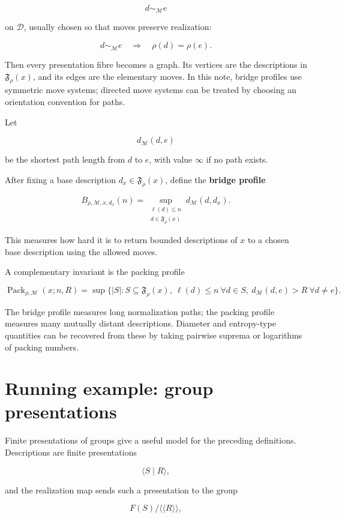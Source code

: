 \documentclass[11pt]{article}
\begin{document}
\[
d\sim_{\mathcal M} e
\]

on \(\mathcal D\), usually chosen so that moves preserve realization:

\[
d\sim_{\mathcal M} e
\quad\Longrightarrow\quad
\rho(d)=\rho(e).
\]

Then every presentation fibre becomes a graph. Its vertices are the descriptions in \(\mathfrak F_\rho(x)\), and its edges are the elementary moves. In this note, bridge profiles use symmetric move systems; directed move systems can be treated by choosing an orientation convention for paths.

Let

\[
d_{\mathcal M}(d,e)
\]

be the shortest path length from \(d\) to \(e\), with value \(\infty\) if no path exists.

After fixing a base description \(d_x\in\mathfrak F_\rho(x)\), define the \textbf{bridge profile}

\[
B_{\rho,\mathcal M,x,d_x}(n)=
\sup_{\substack{\ell(d)\leq n\\ d\in\mathfrak F_\rho(x)}}
d_{\mathcal M}(d,d_x).
\]

This measures how hard it is to return bounded descriptions of \(x\) to a chosen base description using the allowed moves.

A complementary invariant is the packing profile

\[
\operatorname{Pack}_{\rho,\mathcal M}(x;n,R)
=
\sup\{|S|:S\subseteq\mathfrak F_\rho(x),\ \ell(d)\leq n\ \forall d\in S,\ d_{\mathcal M}(d,e)>R\ \forall d\neq e\}.
\]

The bridge profile measures long normalization paths; the packing profile measures many mutually distant descriptions. Diameter and entropy-type quantities can be recovered from these by taking pairwise suprema or logarithms of packing numbers.


\section{Running example: group presentations}

Finite presentations of groups give a useful model for the preceding definitions. Descriptions are finite presentations

\[
\langle S\mid R\rangle,
\]

and the realization map sends such a presentation to the group

\[
F(S)/\langle\!\langle R\rangle\!\rangle,
\]
\end{document}

